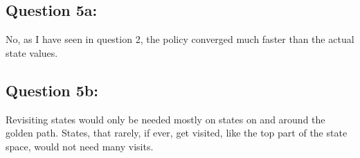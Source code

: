 \subsection*{Question 5a:}\label{sec:5a}

No, as I have seen in question 2, the policy converged much faster than the actual state values.

\subsection*{Question 5b:}\label{sec:5b}

Revisiting states would only be needed mostly on states on and around the golden path.
States, that rarely, if ever, get visited, like the top part of the state space, would not need many visits.
